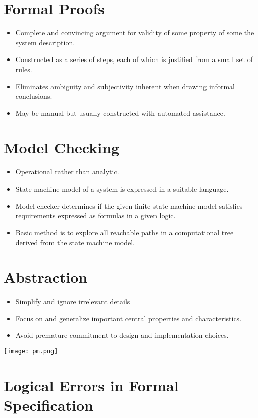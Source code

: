 \documentclass{article}
\begin{document}
    \section{Formal Proofs}
    \begin{itemize}
        \item Complete and convincing argument for validity of some property of some the system description.
        \item Constructed as a series of steps, each of which is justified from a small set of rules.
        \item Eliminates ambiguity and subjectivity inherent when drawing informal conclusions.
        \item May be manual but usually constructed with automated assistance.
    \end{itemize}
    \section{Model Checking}
    \begin{itemize}
        \item Operational rather than analytic.
        \item State machine model of a system is expressed in a suitable language.
        \item Model checker determines if the given finite state machine model satisfies requirements expressed as formulas in a given logic. 
        \item Basic method is to explore all reachable paths in a computational tree derived from the state machine model.
    \end{itemize}
    \section{Abstraction}
    \begin{itemize}
        \item Simplify and ignore irrelevant details
        \item Focus on and generalize important central properties and characteristics.
        \item Avoid premature commitment to design and implementation choices.
    \end{itemize}
    \texttt{[image: pm.png]}\\
    \section{Logical Errors in Formal Specification}
\end{document}
